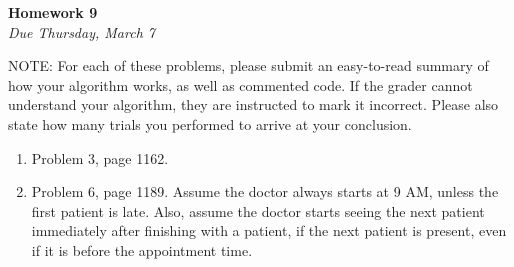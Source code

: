 \documentclass[oneside,12pt]{memoir}
\begin{document}
\begin{center}
\textbf{\large Homework 9} \\
\emph{Due Thursday, March 7}
\end{center}

\noindent NOTE: For each of these problems, please submit an easy-to-read summary of how your algorithm works, as well as commented code. If the grader cannot understand your algorithm, they are instructed to mark it incorrect. Please also state how many trials you performed to arrive at your conclusion.

\begin{enumerate}[leftmargin=*]

\item Problem 3, page 1162.
\item Problem 6, page 1189. Assume the doctor always starts at 9 AM, unless the first patient is late. Also, assume the doctor starts seeing the next patient immediately after finishing with a patient, if the next patient is present, even if it is before the appointment time.

\end{enumerate}
\end{document}
